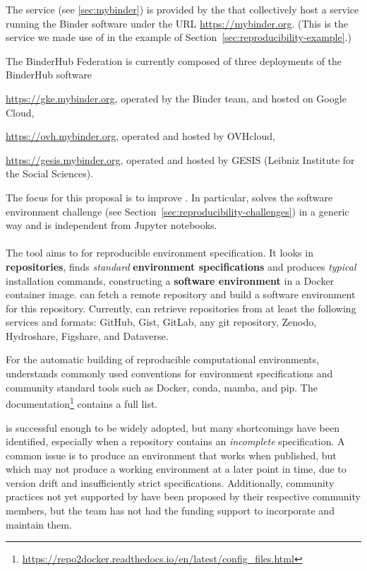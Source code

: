The \emph{\mybinder{}} service (see \ref{sec:mybinder}) is provided by the  that collectively host a service running the Binder software
under the URL \url{https://mybinder.org}. (This is the service we made use of in the example
of Section~\ref{sec:reproducibility-example}.)

The BinderHub Federation is currently composed of three deployments of the BinderHub software

\begin{compactitem}
\item \url{https://gke.mybinder.org}, operated by the Binder team, and hosted on Google Cloud,
\item \url{https://ovh.mybinder.org}, operated and hosted by OVHcloud,
\item \url{https://gesis.mybinder.org}, operated and hosted by GESIS (Leibniz Institute for the Social Sciences).
\end{compactitem}

The focus for this proposal is to improve \repotodocker{}. In particular,
\repotodocker{} solves the software environment challenge (see
Section~\ref{sec:reproducibility-challenges}) in a generic way and is independent
from Jupyter notebooks.


\paragraph{\repotodocker}\label{sec:repo2docker}
The \repotodocker{} tool aims to  for reproducible environment specification.
It looks in \textbf{repositories}, finds \emph{standard} \textbf{environment specifications} and produces \emph{typical} installation commands,
constructing a \textbf{software environment} in a Docker container image.
\repotodocker{} can fetch a remote repository and build a software
environment for this repository. Currently, \repotodocker{} can retrieve
repositories from at least the following services and formats: GitHub, Gist, GitLab, any git repository,
Zenodo, Hydroshare, Figshare, and Dataverse.

For the automatic building of reproducible computational environments,
\repotodocker{} understands commonly used conventions for environment specifications and
community standard tools such as Docker, conda, mamba, and pip.
The
documentation\footnote{\url{https://repo2docker.readthedocs.io/en/latest/config_files.html}}
  contains a full list.

\repotodocker{} is successful enough to be widely adopted,
but many shortcomings have been identified,
especially when a repository contains an \emph{incomplete} specification.
A common issue is to produce an environment that works when published,
but which may not produce a working environment at a later point in time,
due to version drift and insufficiently strict specifications.
Additionally, community practices not yet supported by \repotodocker{} have been proposed by their respective community members,
but the \repotodocker{} team has not had the funding support to incorporate and maintain them.

